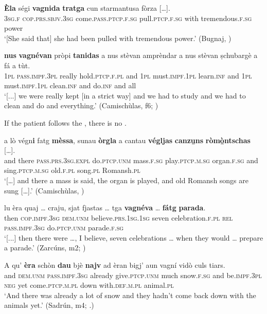 \ea
\label{ex:pass.dyn2}
\gll \textbf{Èla} ségi \textbf{vagnida} \textbf{tratga} cun starmantusa fòrza […].\\
\textsc{3sg.f} \textsc{cop.prs.sbjv.3sg} come.\textsc{pass.ptcp.f.sg} pull.\textsc{ptcp.f.sg} with tremendous.\textsc{f.sg} power\\
\glt `[She said that] she had been pulled with tremendous power.' (Bugnaj, \citealt[132]{Büchli1966})
\z

\ea
\label{ex:pass.dyn3}
\gll    [...] \textbf{nus} \textbf{vagnévan} pròpi \textbf{tanidas} a nus stèvan amprèndar a nus stèvan ṣchubargè a fá a tùt.\\
{} \textsc{1pl} \textsc{pass.impf.3pl} really hold.\textsc{ptcp.f.pl} and \textsc{1pl} must.\textsc{impf.1pl} learn.\textsc{inf} and \textsc{1pl}  must.\textsc{impf.1pl} clean.\textsc{inf} and do.\textsc{inf} and all\\
\glt `[...] we were really kept [in a strict way] and we had to study and we had to clean and do and everything.' (Camischùlas, f6; )
\z

If the patient  follows the , there is no .

\ea
\label{ex:pass.dyn4}
\gll    [...] a lò végn\textbf{i} fatg \textbf{mèssa}, sunau \textbf{òrgla} a cantau \textbf{végljas} \textbf{canzu̱ns} \textbf{ròmò̱ntschas} […].\\
{} and there \textsc{pass.prs.3sg}.\textsc{expl} do.\textsc{ptcp.unm} mass.\textsc{f.sg} play.\textsc{ptcp.m.sg} organ.\textsc{f.sg}  and sing.\textsc{ptcp.m.sg} old.\textsc{f.pl} song.\textsc{pl} Romansh.\textsc{pl}\\
\glt `[…] and there a mass is said, the organ is played, and old Romansh songs are sung […].' (Camischùlas, \citealt[94]{Büchli1966})
\z

\ea
\label{ex:pass.dyn5}
\gll    [...] lu èra quaj … craju, sjat fjastas … tga \textbf{vagnéva} … \textbf{fátg} \textbf{parada}.\\
{} then \textsc{cop.impf.3sg} \textsc{dem.unm} {} believe.\textsc{prs.1sg.1sg} seven celebration.\textsc{f.pl} {} \textsc{rel} \textsc{pass.impf.3sg} {} do.\textsc{ptcp.unm} parade.\textsc{f.sg}\\
\glt `[...] then there were …, I believe, seven celebrations … when they would … prepare a parade.' (Zarcúns, m2; )
\z

\ea
\label{ex:pass.stat1}
\gll A qu' \textbf{èra} schòn \textbf{dau} bjè \textbf{najv} ad èran bigj’ aun vagní vidò culs tiars.\\  
and \textsc{dem.unm} \textsc{pass.impf.3sg} already give.\textsc{ptcp.unm} much snow.\textsc{f.sg} and be.\textsc{impf.3pl} \textsc{neg} yet come.\textsc{ptcp.m.pl} down with.\textsc{def.m.pl} animal.\textsc{pl} \\
\glt `And there was already a lot of snow and they hadn’t come back down with the animals yet.' (Sadrún, m4; .)
\z

